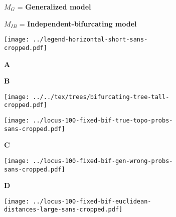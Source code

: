 \documentclass[border=10pt,varwidth=30cm]{standalone}
\begin{document}
\begin{figure}
    \centering
    \begin{subfigure}[c][][c]{0.44\textwidth}
        \centering
        \Huge $M_{G}$ = \textbf{Generalized model}
    \end{subfigure}
    \hfill
    \begin{subfigure}[c][][c]{0.54\textwidth}
        \centering
        \Huge $M_{IB}$ = \textbf{Independent-bifurcating model}
    \end{subfigure}
    \vspace{2mm}
    \begin{subfigure}[c][][c]{\textwidth}
        \centering
        \texttt{[image: ../legend-horizontal-short-sans-cropped.pdf]}
    \end{subfigure}
    \vspace{2mm}
    \begin{subfigure}[b][][l]{0.55\textwidth}
        \huge \textbf{A}
    \end{subfigure}
    \hfill
    \begin{subfigure}[b][][l]{0.43\textwidth}
        \huge \textbf{B}
    \end{subfigure}
    \vspace{2mm}
    \begin{subfigure}[c][][c]{0.55\textwidth}
        \centering
        \texttt{[image: ../../tex/trees/bifurcating-tree-tall-cropped.pdf]}
        \label{fig:gentree}
    \end{subfigure}
    \hfill
    \begin{subfigure}[c][][c]{0.43\textwidth}
        \centering
        \texttt{[image: ../locus-100-fixed-bif-true-topo-probs-sans-cropped.pdf]}
    \end{subfigure}
    \begin{subfigure}[b][][l]{\textwidth}
        \huge \textbf{C}
    \end{subfigure}
    \begin{subfigure}[c][][c]{\textwidth}
        \centering
        \texttt{[image: ../locus-100-fixed-bif-gen-wrong-probs-sans-cropped.pdf]}
    \end{subfigure}
    \begin{subfigure}[b][][l]{\textwidth}
        \huge \textbf{D}
    \end{subfigure}
    \begin{subfigure}[c][][c]{\textwidth}
        \centering
        \texttt{[image: ../locus-100-fixed-bif-euclidean-distances-large-sans-cropped.pdf]}
    \end{subfigure}
\end{figure}
\end{document}
